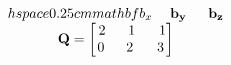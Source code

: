 \documentclass[preview]{standalone}
\begin{document}
\begin{align*}
\begin{array}{ccc}\begin{matrix}\\hspace{0.25cm} mathbf{b_{x}} & \hspace{0.1cm} \mathbf{b_{y}} \hspace{0.1cm}& \hspace{0.1cm} \mathbf{b_{z}} \end{matrix} \\ \mathbf{Q} = \begin{bmatrix} 2 & \hspace{0.1cm} 1 \hspace{0.1cm}& \hspace{0.1cm} 1 \\ \hspace{0.04cm}  0 \hspace{0.1cm} & \hspace{0.1cm} 2 \hspace{0.1cm}\hspace{0.1cm} & 3 \end{bmatrix} \end{array}
\end{align*}
\end{document}
